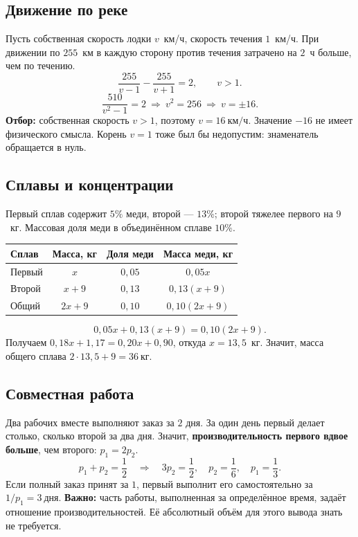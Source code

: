 \documentclass[a4paper,12pt]{article}
\newcommand{\key}[1]{\textbf{\color{darkaccent}#1}}
\begin{document}
\subsection{Движение по реке}
Пусть собственная скорость лодки $v$~км/ч, скорость течения $1$~км/ч. При движении по $255$~км в каждую сторону против течения затрачено на $2$~ч больше, чем по течению.
\[
\frac{255}{v-1}-\frac{255}{v+1}=2,\qquad v>1.
\]
\[
\frac{510}{v^2-1}=2\ \Longrightarrow\ v^2=256\ \Longrightarrow\ v=\pm16.
\]
\key{Отбор:} собственная скорость $v>1$, поэтому $\boxed{v=16\ \text{км/ч}}$. Значение $-16$ не имеет физического смысла. Корень $v=1$ тоже был бы недопустим: знаменатель обращается в нуль.

\subsection{Сплавы и концентрации}
Первый сплав содержит $5\%$ меди, второй — $13\%$; второй тяжелее первого на $9$~кг. Массовая доля меди в объединённом сплаве $10\%$.
\begin{center}
\renewcommand{\arraystretch}{1.28}
\begin{tabularx}{\linewidth}{@{}Xccc@{}}
\toprule
Сплав & Масса, кг & Доля меди & Масса меди, кг \\
\midrule
Первый & $x$ & $0{,}05$ & $0{,}05x$\\
Второй & $x+9$ & $0{,}13$ & $0{,}13(x+9)$\\
Общий & $2x+9$ & $0{,}10$ & $0{,}10(2x+9)$\\
\bottomrule
\end{tabularx}
\end{center}
\[
0{,}05x+0{,}13(x+9)=0{,}10(2x+9).
\]
Получаем $0{,}18x+1{,}17=0{,}20x+0{,}90$, откуда $x=13{,}5$~кг. Значит, масса общего сплава $2\cdot13{,}5+9=\boxed{36\ \text{кг}}$.

\subsection{Совместная работа}
Два рабочих вместе выполняют заказ за $2$ дня. За один день первый делает столько, сколько второй за два дня. Значит, \key{производительность первого вдвое больше}, чем второго: $p_1=2p_2$.
\[
p_1+p_2=\frac12\quad\Longrightarrow\quad 3p_2=\frac12,
\quad p_2=\frac16,\quad p_1=\frac13.
\]
Если полный заказ принят за $1$, первый выполнит его самостоятельно за $1/p_1=\boxed{3\ \text{дня}}$.
\key{Важно:} часть работы, выполненная за определённое время, задаёт отношение производительностей. Её абсолютный объём для этого вывода знать не требуется.
\end{document}
